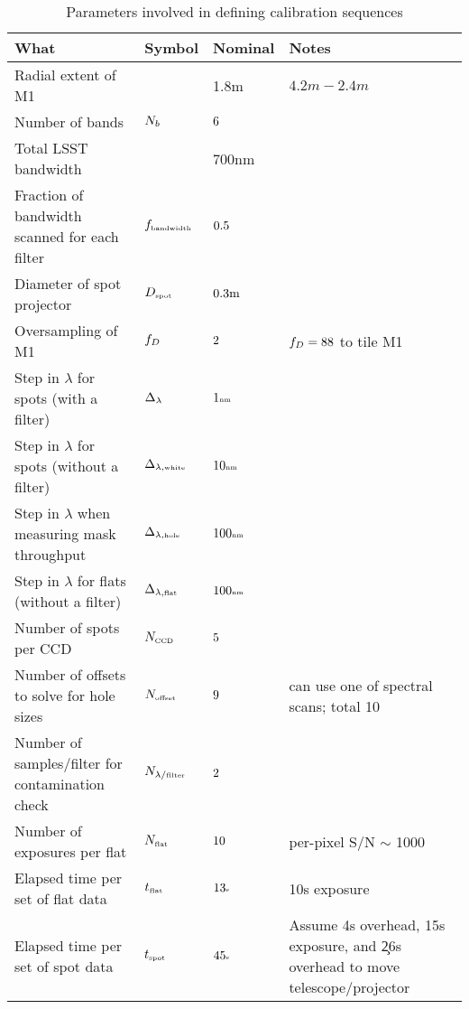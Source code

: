 \begin{table}
\begin{center}
  \begin{tabular}{lllp{4cm}}
    What & Symbol & Nominal & Notes \\
    \hline
    Radial extent of M1 & & 1.8m & $4.2m - 2.4m$ \\
    Number of bands & $N_b$ & $6$ \\
    Total LSST bandwidth  & & 700nm & \\
    \noalign{\medskip}
    Fraction of bandwidth scanned for each filter & $f_{\mbox{\tiny bandwidth}}$ & $0.5$ \\
    Diameter of spot projector & $D_{\mbox{\tiny spot}}$ & $0.3\mbox{m}$ \\
    Oversampling of M1 & $f_D$ & $2$ & $f_D = 88$ to tile M1 \\
    Step in $\lambda$ for spots (with a filter) & $\Delta_\lambda$ & $1\mbox{\tiny nm}$ \\
    Step in $\lambda$ for spots (without a filter) & $\Delta_{\lambda,\mbox{\tiny white}}$ & $10\mbox{\tiny nm}$ \\
    Step in $\lambda$ when measuring mask throughput & $\Delta_{\lambda,\mbox{\tiny hole}}$ & $100\mbox{\tiny nm}$ \\
    Step in $\lambda$ for flats (without a filter) & $\Delta_{\lambda,\mbox{\tiny flat}}$ & $100\mbox{\tiny nm}$ \\
    Number of spots per CCD & $N_{\mbox{\tiny CCD}}$ & $5$ \\
    Number of offsets to solve for hole sizes & $N_{\mbox{\tiny offset}}$ & $9$ & can use one of spectral scans; total 10 \\
    Number of samples/filter for contamination check & $N_{\lambda/\mbox{\tiny filter}}$ & $2$ \\
    Number of exposures per flat & $N_{\mbox{\tiny flat}}$ & $10$ & per-pixel S/N $\sim$ 1000 \\
    Elapsed time per set of flat data & $t_{\mbox{\tiny flat}}$ & $13\mbox{\tiny s}$ & 10s exposure \\
    Elapsed time per set of spot data & $t_{\mbox{\tiny spot}}$ & $45\mbox{\tiny s}$ &
    Assume 4s overhead, 15s exposure, and \c 26s overhead to move telescope/projector \\
  \end{tabular}
  \caption{
    Parameters involved in defining calibration sequences
  }
  \label{tab:CalibrationParams}
\end{center}
\end{table}

